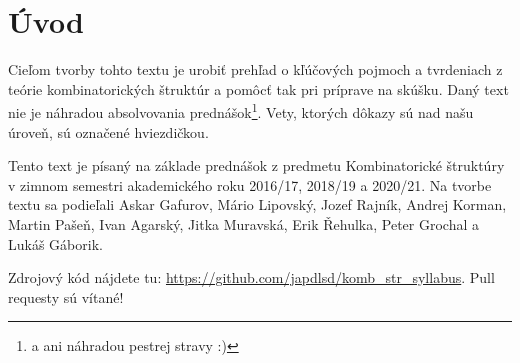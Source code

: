 \chapter*{Úvod}

Cieľom tvorby tohto textu je urobiť prehľad o kľúčových pojmoch a tvrdeniach z teórie kombinatorických štruktúr a pomôcť tak pri príprave na skúšku. 
Daný text nie je náhradou absolvovania prednášok\footnote{a ani náhradou pestrej stravy :)}.
Vety, ktorých dôkazy sú nad našu úroveň, sú označené hviezdičkou.

Tento text je písaný na základe prednášok z predmetu Kombinatorické štruktúry v zimnom semestri akademického roku 2016/17, 2018/19 a 2020/21.
Na tvorbe textu sa podieľali
Askar Gafurov,
Mário Lipovský,
Jozef Rajník,
Andrej Korman,
Martin Pašeň,
Ivan Agarský,
Jitka Muravská,
Erik Řehulka,
Peter Grochal
a
Lukáš Gáborik.

Zdrojový kód nájdete tu: \url{https://github.com/japdlsd/komb_str_syllabus}. Pull requesty sú vítané!

